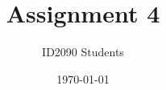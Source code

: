 \documentclass{article}
\begin{document}
\title{Assignment 4}
\author{ID2090 Students}
\date{\today}
\maketitle





\end{document}
